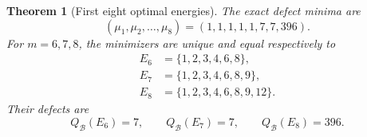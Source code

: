 \documentclass[11pt,oneside]{article}
\newtheorem{theorem}{Theorem}[section]
\theoremstyle{definition}
\theoremstyle{remark}
\newcommand{\B}{\mathcal B}
\begin{document}
\begin{theorem}[First eight optimal energies]
\label{thm:first-eight-energies}
The exact defect minima are
\begin{equation}
 \boxed{
 (\mu_1,\mu_2,\ldots,\mu_8)
 =(1,1,1,1,1,7,7,396).}
 \label{eq:first-eight-mu}
\end{equation}
For \(m=6,7,8\), the minimizers are unique and equal respectively to
\begin{align}
 E_6&=\{1,2,3,4,6,8\},
 \label{eq:E6-unique}\\
 E_7&=\{1,2,3,4,6,8,9\},
 \label{eq:E7-unique}\\
 E_8&=\{1,2,3,4,6,8,9,12\}.
 \label{eq:E8-unique}
\end{align}
Their defects are
\[
 Q_{\B}(E_6)=7,
 \qquad
 Q_{\B}(E_7)=7,
 \qquad
 Q_{\B}(E_8)=396.
\]
\end{theorem}
\end{document}
